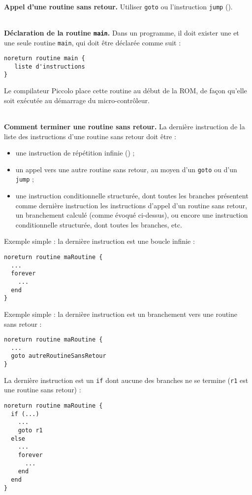 ~\\
\textbf{Appel d’une routine sans retour.} Utiliser \texttt{goto} ou l'instruction \texttt{jump} ().


~\\
\textbf{Déclaration de la routine \texttt{main}.} Dans un programme, il doit exister une et une seule routine \texttt{main}, qui doit être déclarée comme suit :

\begin{lstlisting}[language=piccolo]
noreturn routine main {
   liste d'instructions
}

\end{lstlisting}

Le compilateur Piccolo place cette routine au début de la ROM, de façon qu'elle soit exécutée au démarrage du micro-contrôleur.


~\\
\textbf{Comment terminer une routine sans retour.} La dernière instruction de la liste des instructions d’une routine sans retour doit être :
\begin{itemize}
  \item une instruction de répétition infinie () ;
  \item un appel vers une autre routine sans retour, au moyen d’un \texttt{goto} ou d'un \texttt{jump} ;
  \item une instruction conditionnelle structurée, dont toutes les branches présentent comme dernière instruction les instructions d’appel d’un routine sans retour, un branchement calculé (comme évoqué ci-dessus), ou encore une instruction conditionnelle structurée, dont toutes les branches, etc.

\end{itemize}

Exemple simple : la dernière instruction est une boucle infinie :
\begin{lstlisting}[language=piccolo]
noreturn routine maRoutine {
  ...
  forever
    ...
  end
}
\end{lstlisting}

Exemple simple : la dernière instruction est un branchement vers une routine sans retour :
\begin{lstlisting}[language=piccolo]
noreturn routine maRoutine {
  ...
  goto autreRoutineSansRetour
}
\end{lstlisting}


La dernière instruction est un \texttt{if} dont aucune des branches ne se termine (\texttt{r1} est une routine sans retour) :
\begin{lstlisting}[language=piccolo]
noreturn routine maRoutine {
  if (...)
    ...
    goto r1
  else
    ...
    forever
      ...
    end
  end
}

\end{lstlisting}



